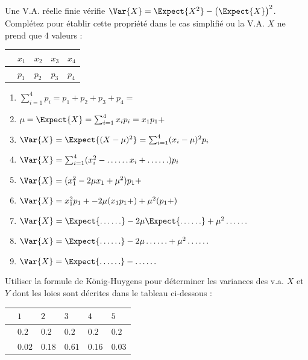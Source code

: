 \documentclass[main.tex]{subfiles}
\begin{document}
\begin{exercise} Une V.A. réelle finie vérifie $\Var{X}=\Expect{X^2}-\big(\Expect{X}\big)^2$.   \\
	Complétez pour établir cette propriété dans le cas simplifié ou la V.A. $X$ ne prend que 4 valeurs : \\
	\renewcommand{\arraystretch}{1.25} 
	\null	\hfill \begin{tabularx}{0.7\linewidth}{|c|Y|Y|Y|Y|}
		\hline
		 & $x_1$ & $x_2$ & $x_3$ & $x_4$ \\ \hline
		 & $p_1$ & $p_2$  & $p_3$  & $p_4$  \\\hline
	\end{tabularx} 
	\hfill \null
	\begin{spacing}{2}
		\begin{enumerate}[label={},leftmargin=*]  
			\item $\sum_{i=1}^{4}p_i=p_1+p_2+ p_3+p_4=$\dotfill
			\item $\mu=\Expect{X}=\sum_{i=1}^{4}x_ip_i=x_1p_1+\dotfill $
			\item $\Var{X}=\Expect{(X-\mu)^2} =\sum_{i=1}^4 (x_i   -\mu)^2p_i$
			\item $\Var{X}=\sum_{i=1}^4 (x_i^2-\ldots\ldots x_i + \ldots\ldots)p_i$
			\item $\Var{X}= (x_1^2-2\mu  x_1 + \mu^2)p_1+\dotfill $
			\item $\Var{X}=x_1^2p_1+ \dotfill -2\mu(x_1p_1+\dotfill )+ \mu^2(p_1+\dotfill)$
			\item $\Var{X}=\Expect{\ldots\ldots} \hfill -2\mu \Expect{\ldots\ldots} \hfill+ \mu^2\ldots\ldots$\hfill
			\item $\Var{X}=\Expect{\ldots\ldots} -2\mu \ldots\ldots + \mu^2\ldots\ldots$
			\item $\Var{X}=\Expect{\ldots\ldots} -  \ldots\ldots$
		\end{enumerate}
	\end{spacing} 
\end{exercise}
\vspace{-1.5em}
\begin{exercise}Utiliser la formule de König-Huygens pour déterminer les variances des v.a. $X$ et $Y$ dont les loies sont décrites dans le tableau ci-dessous :\\
	\renewcommand{\arraystretch}{1.25} 
	\null	\hfill \begin{tabularx}{0.7\linewidth}{|c|Y|Y|Y|Y|Y|}
		\hline
		 & $1$ & $2$ & $3$ & $4$ & $5$ \\ \hline
		 & $0.2$ & $0.2$  & $0.2$  & $0.2$   & $0.2$  \\\hline
		 & $0.02$ & $0.18$  & $0.61$  & $0.16$   & $0.03$  \\\hline
	\end{tabularx} 
	\hfill \null 
\end{exercise}
\end{document}
